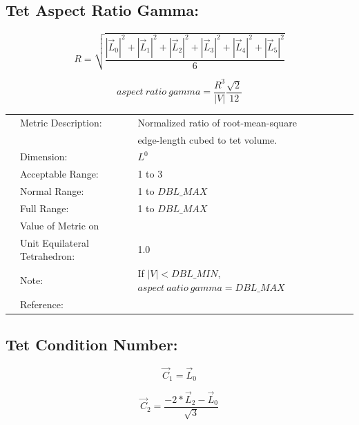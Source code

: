 \documentclass[12pt]{article}
\begin{document}
\subsection*{Tet Aspect Ratio Gamma:}

\begin{displaymath}
R = \sqrt{ \frac{ |\vec L_0|^2 + |\vec L_1|^2 + 
                  |\vec L_2|^2 + |\vec L_3|^2 + 
                  |\vec L_4|^2 + |\vec L_5|^2  } {6} }
\end{displaymath}

\begin{displaymath}
aspect~ratio~gamma = \frac{R^3}{|V|}\frac{\sqrt{2}}{12}
\end{displaymath}

\begin{tabular}{lll}
& Metric Description:  & Normalized ratio of root-mean-square \\ 
&                      & edge-length cubed to tet volume. \\
& Dimension:           & $L^0$              \\ 
& Acceptable Range:    & 1 to 3 \\ 
& Normal Range:        & 1 to $DBL\_MAX$   \\ 
& Full Range:          & 1 to $DBL\_MAX$   \\ 
& Value of Metric on   &  \\
& Unit Equilateral Tetrahedron:    & 1.0 \\
& Note:                & If $|V| < DBL\_MIN$, $aspect~aatio~gamma = DBL\_MAX$ \\
& Reference:           & \cite{one} \\
\end{tabular} 



\subsection*{Tet Condition Number:}

\begin{displaymath}
\vec C_1 = \vec L_0 
\end{displaymath}

\begin{displaymath}
\vec C_2 = \frac {-2 * \vec L_2 - \vec L_0} { \sqrt{3} } 
\end{displaymath}
\end{document}
